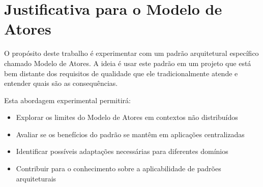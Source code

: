 \section{Justificativa para o Modelo de Atores}

O propósito deste trabalho é experimentar com um padrão arquitetural específico chamado Modelo de Atores. A ideia é usar este padrão em um projeto que está bem distante dos requisitos de qualidade que ele tradicionalmente atende e entender quais são as consequências.

Esta abordagem experimental permitirá:

\begin{itemize}
    \item Explorar os limites do Modelo de Atores em contextos não distribuídos
    \item Avaliar se os benefícios do padrão se mantêm em aplicações centralizadas
    \item Identificar possíveis adaptações necessárias para diferentes domínios
    \item Contribuir para o conhecimento sobre a aplicabilidade de padrões arquiteturais
\end{itemize}
